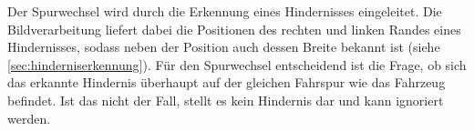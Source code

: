Der Spurwechsel wird durch die Erkennung eines Hindernisses eingeleitet. Die Bildverarbeitung liefert dabei die Positionen des rechten und linken Randes eines Hindernisses, sodass neben der Position auch dessen Breite bekannt ist (siehe \autoref{sec:hinderniserkennung}). Für den Spurwechsel entscheidend ist die Frage, ob sich das erkannte Hindernis überhaupt auf der gleichen Fahrspur wie das Fahrzeug befindet. Ist das nicht der Fall, stellt es kein Hindernis dar und kann ignoriert werden.
